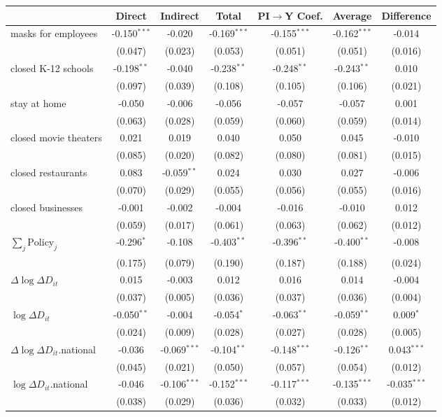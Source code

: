 
\begin{tabular}{lccccc|>{}c}
\toprule
  & Direct & Indirect & Total & PI$\to$Y Coef. & Average & Difference\\
\midrule
masks for employees & -0.150$^{***}$ & -0.020 & -0.169$^{***}$ & -0.155$^{***}$ & -0.162$^{***}$ & -0.014\\
 & (0.047) & (0.023) & (0.053) & (0.051) & (0.051) & (0.016)\\
closed K-12 schools & -0.198$^{**}$ & -0.040 & -0.238$^{**}$ & -0.248$^{**}$ & -0.243$^{**}$ & 0.010\\
 & (0.097) & (0.039) & (0.108) & (0.105) & (0.106) & (0.021)\\
stay at home & -0.050 & -0.006 & -0.056 & -0.057 & -0.057 & 0.001\\
 & (0.063) & (0.028) & (0.059) & (0.060) & (0.059) & (0.014)\\
closed movie theaters & 0.021 & 0.019 & 0.040 & 0.050 & 0.045 & -0.010\\
 & (0.085) & (0.020) & (0.082) & (0.080) & (0.081) & (0.015)\\
closed restaurants & 0.083 & -0.059$^{**}$ & 0.024 & 0.030 & 0.027 & -0.006\\
 & (0.070) & (0.029) & (0.055) & (0.056) & (0.055) & (0.016)\\
closed businesses & -0.001 & -0.002 & -0.004 & -0.016 & -0.010 & 0.012\\
 & (0.059) & (0.017) & (0.061) & (0.063) & (0.062) & (0.012)\\
$\sum_j \mathrm{Policy}_j$ & -0.296$^{*}$ & -0.108 & -0.403$^{**}$ & -0.396$^{**}$ & -0.400$^{**}$ & -0.008\\
 & (0.175) & (0.079) & (0.190) & (0.187) & (0.188) & (0.024)\\
$\Delta \log \Delta D_{it}$ & 0.015 & -0.003 & 0.012 & 0.016 & 0.014 & -0.004\\
 & (0.037) & (0.005) & (0.036) & (0.037) & (0.036) & (0.004)\\
$\log \Delta D_{it}$ & -0.050$^{**}$ & -0.004 & -0.054$^{*}$ & -0.063$^{**}$ & -0.059$^{**}$ & 0.009$^{*}$\\
 & (0.024) & (0.009) & (0.028) & (0.027) & (0.028) & (0.005)\\
$\Delta \log \Delta D_{it}$.national & -0.036 & -0.069$^{***}$ & -0.104$^{**}$ & -0.148$^{***}$ & -0.126$^{**}$ & 0.043$^{***}$\\
 & (0.045) & (0.021) & (0.050) & (0.057) & (0.054) & (0.012)\\
$\log \Delta D_{it}$.national & -0.046 & -0.106$^{***}$ & -0.152$^{***}$ & -0.117$^{***}$ & -0.135$^{***}$ & -0.035$^{***}$\\
 & (0.038) & (0.029) & (0.036) & (0.032) & (0.033) & (0.012)\\
\bottomrule
\end{tabular}